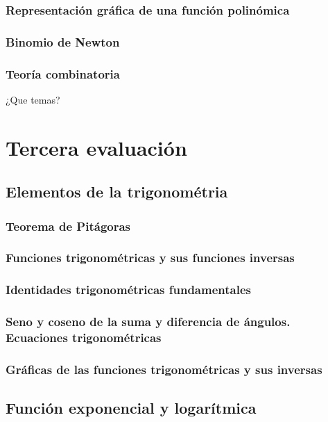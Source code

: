 \subsection{Representación gráfica de una función polinómica}

\subsection{Binomio de Newton}

\subsection{Teoría combinatoria}

{\huge ¿Que temas?}

\chapter{Tercera evaluación}

\section{Elementos de la trigonométria}

\subsection{Teorema de Pitágoras}

\subsection{Funciones trigonométricas y sus funciones inversas}

\subsection{Identidades trigonométricas fundamentales}

\subsection{Seno y coseno de la suma y diferencia de ángulos. Ecuaciones trigonométricas}

\subsection{Gráficas de las funciones trigonométricas y sus inversas}

\section{Función exponencial y logarítmica}


